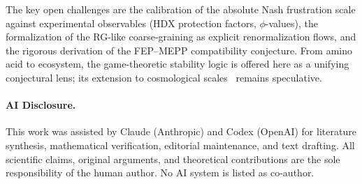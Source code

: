 \documentclass[12pt,a4paper]{article}
\theoremstyle{remark}
\begin{document}
The key open challenges are the calibration of the absolute Nash frustration scale against experimental observables (HDX protection factors, $\phi$-values), the formalization of the RG-like coarse-graining as explicit renormalization flows, and the rigorous derivation of the FEP--MEPP compatibility conjecture. From amino acid to ecosystem, the game-theoretic stability logic is offered here as a unifying conjectural lens; its extension to cosmological scales~\citep{FST-Unified2026} remains speculative.

\begingroup
\small
\paragraph*{AI Disclosure.} This work was assisted by Claude (Anthropic) and Codex (OpenAI) for literature synthesis, mathematical verification, editorial maintenance, and text drafting. All scientific claims, original arguments, and theoretical contributions are the sole responsibility of the human author. No AI system is listed as co-author.
\endgroup

\end{document}
